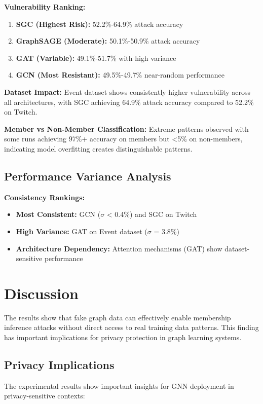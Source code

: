 \documentclass{article}
\begin{document}
\textbf{Vulnerability Ranking:}
\begin{enumerate}
\item \textbf{SGC (Highest Risk):} 52.2\%-64.9\% attack accuracy
\item \textbf{GraphSAGE (Moderate):} 50.1\%-50.9\% attack accuracy  
\item \textbf{GAT (Variable):} 49.1\%-51.7\% with high variance
\item \textbf{GCN (Most Resistant):} 49.5\%-49.7\% near-random performance
\end{enumerate}

\textbf{Dataset Impact:} Event dataset shows consistently higher vulnerability across all architectures, with SGC achieving 64.9\% attack accuracy compared to 52.2\% on Twitch.

\textbf{Member vs Non-Member Classification:} Extreme patterns observed with some runs achieving 97\%+ accuracy on members but <5\% on non-members, indicating model overfitting creates distinguishable patterns.

\subsection{Performance Variance Analysis}
\textbf{Consistency Rankings:}
\begin{itemize}
\item \textbf{Most Consistent:} GCN ($\sigma$ < 0.4\%) and SGC on Twitch
\item \textbf{High Variance:} GAT on Event dataset ($\sigma$ = 3.8\%)
\item \textbf{Architecture Dependency:} Attention mechanisms (GAT) show dataset-sensitive performance
\end{itemize}

\section{Discussion}
The results show that fake graph data can effectively enable membership inference attacks without direct access to real training data patterns. This finding has important implications for privacy protection in graph learning systems.

\subsection{Privacy Implications}
The experimental results show important insights for GNN deployment in privacy-sensitive contexts:
\end{document}
